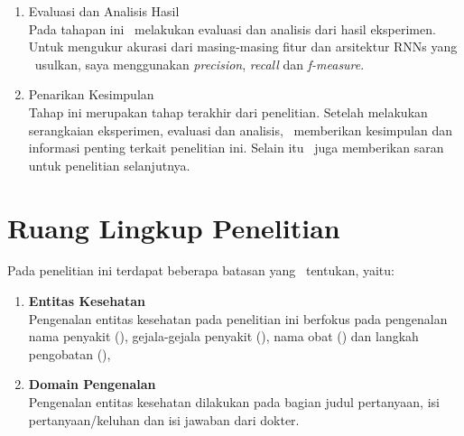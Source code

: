 \begin{enumerate}
	\item Evaluasi dan Analisis Hasil \\
	Pada tahapan ini \saya~melakukan evaluasi dan analisis dari hasil eksperimen. Untuk mengukur akurasi dari masing-masing fitur dan arsitektur RNNs yang \saya~usulkan, saya menggunakan \textit{precision}, \textit{recall} dan \textit{f-measure}.
		
	\item Penarikan Kesimpulan \\
	Tahap ini merupakan tahap terakhir dari penelitian. Setelah melakukan serangkaian eksperimen, evaluasi dan analisis, \saya~memberikan kesimpulan dan informasi penting terkait penelitian ini. Selain itu \saya~juga memberikan saran untuk penelitian selanjutnya.
\end{enumerate}

\section{Ruang Lingkup Penelitian}
Pada penelitian ini terdapat beberapa batasan yang \saya~tentukan, yaitu:
\begin{enumerate}
\item{\bf Entitas Kesehatan}\\
Pengenalan entitas kesehatan pada penelitian ini berfokus pada pengenalan nama penyakit (\disease), gejala-gejala penyakit (\symptom), nama obat (\drug) dan langkah pengobatan (\treatment),

\item{\bf Domain Pengenalan}\\
Pengenalan entitas kesehatan dilakukan pada bagian judul pertanyaan, isi pertanyaan/keluhan dan isi jawaban dari dokter.
\end{enumerate}


